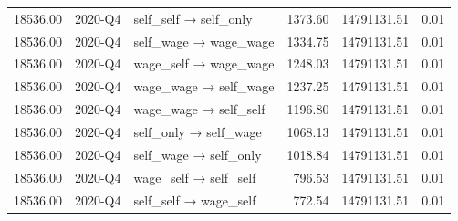 \begin{table}[ht]
{\begin{tabular}{rllrrr}
  18536.00 & 2020-Q4 & self\_self → self\_only & 1373.60 & 14791131.51 & 0.01 \\ 
  18536.00 & 2020-Q4 & self\_wage → wage\_wage & 1334.75 & 14791131.51 & 0.01 \\ 
  18536.00 & 2020-Q4 & wage\_self → wage\_wage & 1248.03 & 14791131.51 & 0.01 \\ 
  18536.00 & 2020-Q4 & wage\_wage → self\_wage & 1237.25 & 14791131.51 & 0.01 \\ 
  18536.00 & 2020-Q4 & wage\_wage → self\_self & 1196.80 & 14791131.51 & 0.01 \\ 
  18536.00 & 2020-Q4 & self\_only → self\_wage & 1068.13 & 14791131.51 & 0.01 \\ 
  18536.00 & 2020-Q4 & self\_wage → self\_only & 1018.84 & 14791131.51 & 0.01 \\ 
  18536.00 & 2020-Q4 & wage\_self → self\_self & 796.53 & 14791131.51 & 0.01 \\ 
  18536.00 & 2020-Q4 & self\_self → wage\_self & 772.54 & 14791131.51 & 0.01 \\ 
   \bottomrule
\end{tabular}
}
\endgroup
\end{table}

